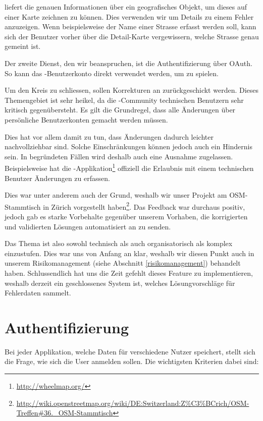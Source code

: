  liefert die genauen Informationen über ein geografisches Objekt, um dieses auf einer Karte zeichnen zu können.
Dies verwenden wir um Details zu einem Fehler anzuzeigen.
Wenn beispielsweise der Name einer Strasse erfasst werden soll, kann sich der Benutzer vorher über die Detail-Karte vergewissern, welche Strasse genau gemeint ist.

Der zweite Dienst, den wir beanspruchen, ist die Authentifizierung über \gls{OAuth}.
So kann das -Benutzerkonto direkt verwendet werden, um \kort{} zu spielen.

Um den Kreis zu schliessen, sollen Korrekturen an  zurückgeschickt werden.
Dieses Themengebiet ist sehr heikel, da die -Community technischen Benutzern sehr kritisch gegenübersteht.
Es gilt die Grundregel, dass alle Änderungen über persönliche Benutzerkonten gemacht werden müssen.

Dies hat vor allem damit zu tun, dass Änderungen dadurch leichter nachvollziehbar sind.
Solche Einschränkungen können jedoch auch ein Hindernis sein.
In begründeten Fällen wird deshalb auch eine Ausnahme zugelassen.
Beispielsweise hat die -Applikation\footnote{\url{http://wheelmap.org/}} offiziell die Erlaubnis mit einem technischen Benutzer Änderungen zu erfassen.

Dies war unter anderem auch der Grund, weshalb wir unser Projekt am OSM-Stammtisch in Zürich vorgestellt haben\footnote{\url{http://wiki.openstreetmap.org/wiki/DE:Switzerland:Z\%C3\%BCrich/OSM-Treffen\#36._OSM-Stammtisch}}.
Das Feedback war durchaus positiv, jedoch gab es starke Vorbehalte gegenüber unserem Vorhaben, die korrigierten und validierten Lösungen automatisiert an  zu senden.

Das Thema ist also sowohl technisch als auch organisatorisch als komplex einzustufen.
Dies war uns von Anfang an klar, weshalb wir diesen Punkt auch in unserem Risikomanagement (siehe Abschnitt \ref{risikomanagement}) behandelt haben.
Schlussendlich hat uns die Zeit gefehlt dieses Feature zu implementieren, weshalb \kort{} derzeit ein geschlossenes System ist, welches Lösungvorschläge für Fehlerdaten sammelt.

\section{Authentifizierung}
Bei jeder Applikation, welche Daten für verschiedene Nutzer speichert, stellt sich die Frage, wie sich die User anmelden sollen.
Die wichtigsten Kriterien dabei sind:

